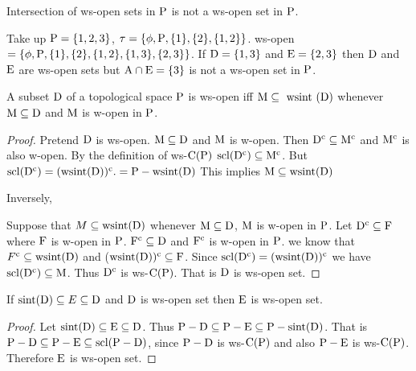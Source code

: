 \begin{rem}\label{rem2.3.4}
Intersection of ws-open sets in $\mathrm{P}$ is not a ws-open set in $\mathrm{P}$.
\end{rem}

\begin{exm}\label{exam2.3.5}
Take up $\mathrm{P} = \{1,2, 3\}$, $\tau = \{\phi, \mathrm{P}, \{1\}, \{2\}, \{1, 2\}\}$. ws-open $= \{\phi, \mathrm{P}, \{1\}, \{2\}, \{1, 2\},\{1,3\},\{2,3\}\}$. If $\mathrm{D}= \{1,3\}$ and $\mathrm{E}=\{2,3\}$ then $\mathrm{D}$ and $\mathrm{E}$ are ws-open sets but $\mathrm{A}\cap \mathrm{E}=\{3\}$ is not a ws-open set in $\mathrm{P}$.
\end{exm}

\begin{thm}\label{thm2.3.6}
A subset $\mathrm{D}$ of a topological space $\mathrm{P}$ is ws-open iff $\TSM\subseteq  \text{ wsint } (\clrD)$ whenever $\mathrm{M}\subseteq \mathrm{D}$ and $\mathrm{M}$ is w-open in $\mathrm{P}$.
\end{thm}

\begin{proof}
Pretend $\mathrm{D}$ is ws-open. $\mathrm{M}\subseteq \mathrm{D}$ and $\mathrm{M}$ is w-open. Then $\mathrm{D}^{\text{c}} \subseteq \mathrm{M}^{\text{c}}$ and $\mathrm{M}^{\text{c}}$ is also w-open. By the definition of ws-$\mathrm{C}(\mathrm{P})$ $\mathrm{scl}(\mathrm{D}^{\text{c}})\subseteq \mathrm{M}^{\text{c}}$. But $\mathrm{scl}(\mathrm{D}^{\text{c}})=(\text{wsint}(\mathrm{D}))^{\text{c}}.=\mathrm{P}-\text{wsint}(\mathrm{D})$ This implies $\TSM\subseteq \text{wsint}(\clrD)$ 

Inversely,

Suppose that $M\subseteq  \mathrm{wsint}(\mathrm{D})$ whenever $\mathrm{M}\subseteq \mathrm{D}$, $\mathrm{M}$ is w-open in $\mathrm{P}$. Let $\mathrm{D}^{\text{c}} \subseteq \mathrm{F}$ where $\mathrm{F}$ is w-open in $\mathrm{P}$. $\mathrm{F}^{\text{c}} \subseteq \mathrm{D}$ and $\mathrm{F}^{\text{c}}$ is w-open in $\mathrm{P}$. we know that $F^{\text{c}} \subseteq \mathrm{wsint}(\mathrm{D})$ and ($\mathrm{wsint}(\mathrm{D}))^{\text{c}} \subseteq \mathrm{F}$. Since $\mathrm{scl}(\mathrm{D}^{\text{c}})= (\mathrm{wsint}(\mathrm{D}))^{\text{c}}$ we have $\mathrm{scl}(\mathrm{D}^{\text{c}})\subseteq \mathrm{M}$. Thus $\mathrm{D}^{\text{c}}$ is ws-$\mathrm{C}(\mathrm{P})$. That is $\mathrm{D}$ is ws-open set.
\end{proof}

\begin{thm}\label{thm2.3.7}
If $\mathrm{sint}(\mathrm{D})\subseteq E\subseteq \mathrm{D}$ and $\mathrm{D}$ is ws-open set then $\mathrm{E}$ is ws-open set.
\end{thm}

\begin{proof}
Let $\mathrm{sint}(\mathrm{D})\subseteq \mathrm{E}\subseteq \mathrm{D}$. Thus $\mathrm{P}-\mathrm{D}\subseteq \mathrm{P}-\mathrm{E}\subseteq \mathrm{P}-\mathrm{sint}(\mathrm{D})$. That is $\mathrm{P}-\mathrm{D}\subseteq \mathrm{P}-\mathrm{E}\subseteq \mathrm{scl}(\mathrm{P}-\mathrm{D})$, since $\mathrm{P}-\mathrm{D}$ is ws-$\mathrm{C}(\mathrm{P})$ and also $\mathrm{P}-\mathrm{E}$ is ws-$\mathrm{C}(\mathrm{P})$. Therefore $\mathrm{E}$  is ws-open set.
\end{proof}

